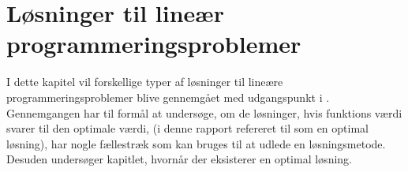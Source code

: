 \chapter{Løsninger til lineær programmeringsproblemer}
I dette kapitel vil forskellige typer af løsninger til lineære programmeringsproblemer blive gennemgået med udgangspunkt i \citep{bert}.
Gennemgangen har til formål at undersøge, om de løsninger, hvis funktions værdi svarer til den optimale værdi, (i denne rapport refereret til som en optimal løsning), har nogle fællestræk som kan bruges til at udlede en løsningsmetode.
Desuden undersøger kapitlet, hvornår der eksisterer en optimal løsning.





